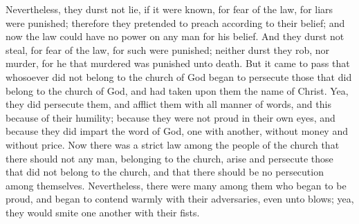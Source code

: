 \bverse \iffalse Nevertheless, they durst not lie, if it were known, for fear of the law, for liars were punished; therefore they pretended to preach according to their belief; and now the law could have no power on any man for his belief. \fi
Nevertheless, they durst not lie, if it were known, for fear of the law, for liars were punished; therefore they pretended to preach according to their belief; and now the law could have no power on any man for his belief.
\bverse \iffalse And they durst not steal, for fear of the law, for such were punished; neither durst they rob, nor murder, for he that murdered was punished unto death. \fi
And they durst not steal, for fear of the law, for such were punished; neither durst they rob, nor murder, for he that murdered was punished unto death.
\bverse \iffalse But it came to pass that whosoever did not belong to the church of God began to persecute those that did belong to the church of God, and had taken upon them the name of Christ. \fi
But it came to pass that whosoever did not belong to the church of God began to persecute those that did belong to the church of God, and had taken upon them the name of Christ.
\bverse \iffalse Yea, they did persecute them, and afflict them with all manner of words, and this because of their humility; because they were not proud in their own eyes, and because they did impart the word of God, one with another, without money and without price. \fi
Yea, they did persecute them, and afflict them with all manner of words, and this because of their humility; because they were not proud in their own eyes, and because they did impart the word of God, one with another, without money and without price.
\bverse \iffalse Now there was a strict law among the people of the church that there should not any man, belonging to the church, arise and persecute those that did not belong to the church, and that there should be no persecution among themselves. \fi
Now there was a strict law among the people of the church that there should not any man, belonging to the church, arise and persecute those that did not belong to the church, and that there should be no persecution among themselves.
\bverse \iffalse Nevertheless, there were many among them who began to be proud, and began to contend warmly with their adversaries, even unto blows; yea, they would smite one another with their fists. \fi
Nevertheless, there were many among them who began to be proud, and began to contend warmly with their adversaries, even unto blows; yea, they would smite one another with their fists.

